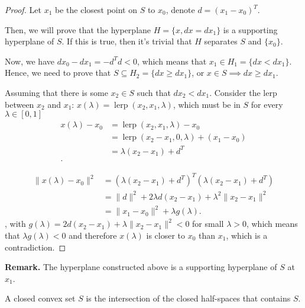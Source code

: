 \begin{proof}
  Let \( x_{1} \) be the closest point on \( S \) to \( x_{0} \), denote \( d =
  (x_{1}-x_{0})^{T}\).

  Then, we will prove that the hyperplane \( H = \{x, dx = dx_{1}\}   \) is a
  supporting hyperplane of \( S \). If this is true, then it's trivial that \( H
  \) separates \( S \) and \( \{x_{0}\}   \).

  Now, we have \( dx_{0}-dx_{1}=-d^{T}d < 0 \), which means that \( x_{1} \in
  H_{1} = \{dx < dx_{1}\}   \). Hence, we need to prove that \( S \subseteq
  H_{2} = \{dx \ge  dx_{1}\}   \), or \( x \in S \implies dx \ge  dx_{1} \).

  Assuming that there is some \( x_{2} \in S \) such that \( dx_{2} < dx_{1} \).
  Consider the lerp between \( x_{2} \) and \( x_{1} \): \( x(\lambda) =
  \operatorname{lerp}(x_{2}, x_{1}, \lambda) \), which must be in \( S \) for
  every \( \lambda \in [0, 1] \)
  \begin{align*}
    x(\lambda) - x_{0} &= \operatorname{lerp}(x_{2}, x_{1}, \lambda) -
    x_{0}\\
                       &= \operatorname{lerp}(x_{2}-x_{1}, 0, \lambda) + (x_{1}
                       - x_{0})\\
                       &= \lambda(x_{2}-x_{1}) + d^{T}\\
  .\end{align*}

  \begin{align*}
    \|x(\lambda)-x_{0}\|^2 &= (\lambda(x_{2}-x_{1}) + d^{T})^{T}(\lambda(x_{2}-x_{1})
    + d^{T})\\
                           &= \|d\|^2 + 2\lambda d(x_{2}-x_{1}) + \lambda
                           ^2\|x_{2}-x_{1}\|^2\\
                           &= \|x_{1}-x_{0}\|^2 + \lambda g(\lambda)
  .\end{align*},
  with \( g(\lambda) = 2d(x_{2}-x_{1}) + \lambda \|x_{2}-x_{1}\|^2 < 0 \) for
  small \( \lambda > 0 \), which means that \( \lambda g(\lambda) < 0 \) and
  therefore \( x(\lambda) \) is closer to \( x_{0} \) than \( x_{1} \), which is
  a contradiction.
\end{proof}

\textbf{Remark. } The hyperplane constructed above is a supporting hyperplane of
\( S \) at \( x_{1} \).

\begin{corollary}
  A closed convex set \( S \) is the intersection of the closed half-spaces that
  contains \( S \).
\end{corollary}

